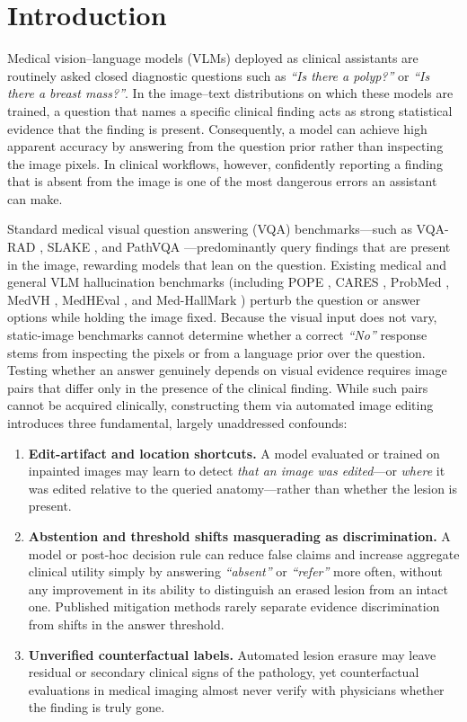 \documentclass{article} %
\begin{document}
\section{Introduction}
\label{sec:intro}
Medical vision--language models (VLMs) deployed as clinical assistants are routinely asked closed diagnostic questions such as \emph{``Is there a polyp?''} or \emph{``Is there a breast mass?''}. In the image--text distributions on which these models are trained, a question that names a specific clinical finding acts as strong statistical evidence that the finding is present. Consequently, a model can achieve high apparent accuracy by answering from the question prior rather than inspecting the image pixels. In clinical workflows, however, confidently reporting a finding that is absent from the image is one of the most dangerous errors an assistant can make.

Standard medical visual question answering (VQA) benchmarks---such as VQA-RAD \citep{lau2018vqarad}, SLAKE \citep{liu2021slake}, and PathVQA \citep{he2020pathvqa}---predominantly query findings that are present in the image, rewarding models that lean on the question. Existing medical and general VLM hallucination benchmarks (including POPE \citep{li2023pope}, CARES \citep{xia2024cares}, ProbMed \citep{yan2024probmed}, MedVH \citep{gu2024medvh}, MedHEval \citep{chang2024medheval}, and Med-HallMark \citep{chen2024medhallmark}) perturb the question or answer options while holding the image fixed. Because the visual input does not vary, static-image benchmarks cannot determine whether a correct \emph{``No''} response stems from inspecting the pixels or from a language prior over the question. Testing whether an answer genuinely depends on visual evidence requires image pairs that differ only in the presence of the clinical finding. While such pairs cannot be acquired clinically, constructing them via automated image editing introduces three fundamental, largely unaddressed confounds:
\begin{enumerate}[leftmargin=*,nosep]
    \item \textbf{Edit-artifact and location shortcuts.} A model evaluated or trained on inpainted images may learn to detect \emph{that an image was edited}---or \emph{where} it was edited relative to the queried anatomy---rather than whether the lesion is present.
    \item \textbf{Abstention and threshold shifts masquerading as discrimination.} A model or post-hoc decision rule can reduce false claims and increase aggregate clinical utility simply by answering \emph{``absent''} or \emph{``refer''} more often, without any improvement in its ability to distinguish an erased lesion from an intact one. Published mitigation methods rarely separate evidence discrimination from shifts in the answer threshold.
    \item \textbf{Unverified counterfactual labels.} Automated lesion erasure may leave residual or secondary clinical signs of the pathology, yet counterfactual evaluations in medical imaging almost never verify with physicians whether the finding is truly gone.
\end{enumerate}
\end{document}
